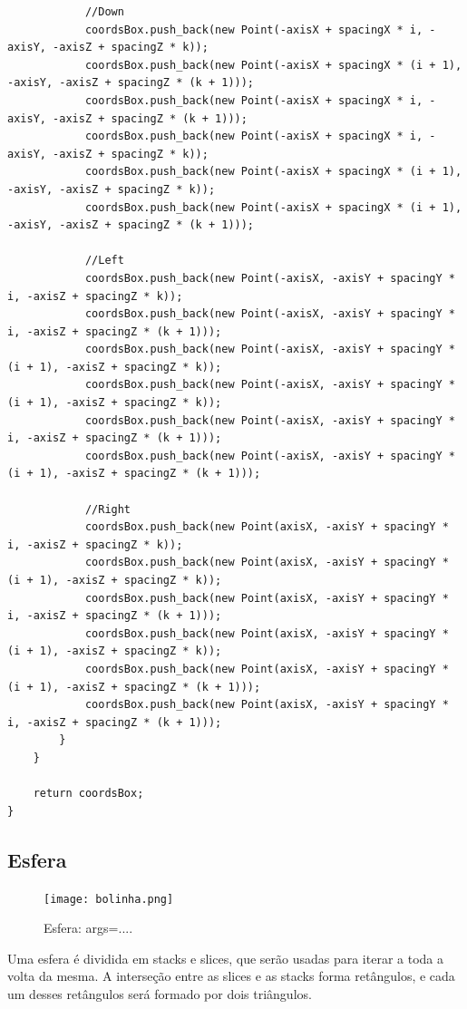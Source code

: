 \documentclass[a4paper]{article}
\begin{document}
\begin{lstlisting}
            //Down
            coordsBox.push_back(new Point(-axisX + spacingX * i, -axisY, -axisZ + spacingZ * k));
            coordsBox.push_back(new Point(-axisX + spacingX * (i + 1), -axisY, -axisZ + spacingZ * (k + 1)));
            coordsBox.push_back(new Point(-axisX + spacingX * i, -axisY, -axisZ + spacingZ * (k + 1)));
            coordsBox.push_back(new Point(-axisX + spacingX * i, -axisY, -axisZ + spacingZ * k));
            coordsBox.push_back(new Point(-axisX + spacingX * (i + 1), -axisY, -axisZ + spacingZ * k));
            coordsBox.push_back(new Point(-axisX + spacingX * (i + 1), -axisY, -axisZ + spacingZ * (k + 1)));

            //Left
            coordsBox.push_back(new Point(-axisX, -axisY + spacingY * i, -axisZ + spacingZ * k));
            coordsBox.push_back(new Point(-axisX, -axisY + spacingY * i, -axisZ + spacingZ * (k + 1)));
            coordsBox.push_back(new Point(-axisX, -axisY + spacingY * (i + 1), -axisZ + spacingZ * k));
            coordsBox.push_back(new Point(-axisX, -axisY + spacingY * (i + 1), -axisZ + spacingZ * k));
            coordsBox.push_back(new Point(-axisX, -axisY + spacingY * i, -axisZ + spacingZ * (k + 1)));
            coordsBox.push_back(new Point(-axisX, -axisY + spacingY * (i + 1), -axisZ + spacingZ * (k + 1)));

            //Right
            coordsBox.push_back(new Point(axisX, -axisY + spacingY * i, -axisZ + spacingZ * k));
            coordsBox.push_back(new Point(axisX, -axisY + spacingY * (i + 1), -axisZ + spacingZ * k));
            coordsBox.push_back(new Point(axisX, -axisY + spacingY * i, -axisZ + spacingZ * (k + 1)));
            coordsBox.push_back(new Point(axisX, -axisY + spacingY * (i + 1), -axisZ + spacingZ * k));
            coordsBox.push_back(new Point(axisX, -axisY + spacingY * (i + 1), -axisZ + spacingZ * (k + 1)));
            coordsBox.push_back(new Point(axisX, -axisY + spacingY * i, -axisZ + spacingZ * (k + 1)));
        }
    }

    return coordsBox;
}
\end{lstlisting}
\subsection{Esfera}

\begin{figure}[H]
\centering
\texttt{[image: bolinha.png]}
\caption{Esfera: args=....}
\end{figure}

Uma esfera é dividida em stacks e slices, que serão usadas para iterar a toda a volta da mesma. A interseção entre as slices e as stacks forma retângulos, e cada um desses retângulos será formado por dois triângulos.
\end{document}
